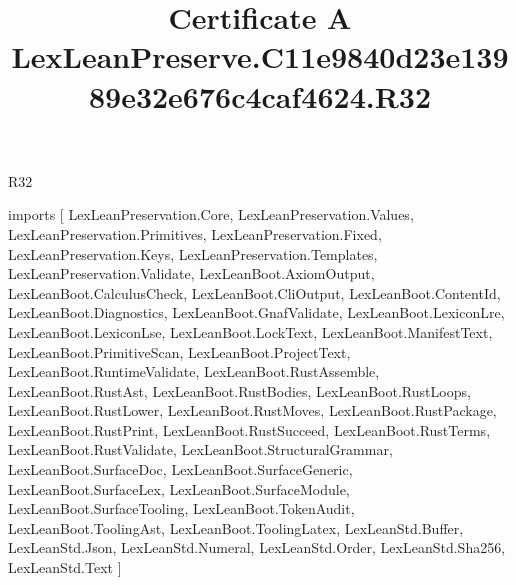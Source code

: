 \begin{lexlean}{R32}
\title{Certificate A LexLeanPreserve.C11e9840d23e13989e32e676c4caf4624.R32}
\begin{coremodule}
imports [
  LexLeanPreservation.Core,
  LexLeanPreservation.Values,
  LexLeanPreservation.Primitives,
  LexLeanPreservation.Fixed,
  LexLeanPreservation.Keys,
  LexLeanPreservation.Templates,
  LexLeanPreservation.Validate,
  LexLeanBoot.AxiomOutput,
  LexLeanBoot.CalculusCheck,
  LexLeanBoot.CliOutput,
  LexLeanBoot.ContentId,
  LexLeanBoot.Diagnostics,
  LexLeanBoot.GnafValidate,
  LexLeanBoot.LexiconLre,
  LexLeanBoot.LexiconLse,
  LexLeanBoot.LockText,
  LexLeanBoot.ManifestText,
  LexLeanBoot.PrimitiveScan,
  LexLeanBoot.ProjectText,
  LexLeanBoot.RuntimeValidate,
  LexLeanBoot.RustAssemble,
  LexLeanBoot.RustAst,
  LexLeanBoot.RustBodies,
  LexLeanBoot.RustLoops,
  LexLeanBoot.RustLower,
  LexLeanBoot.RustMoves,
  LexLeanBoot.RustPackage,
  LexLeanBoot.RustPrint,
  LexLeanBoot.RustSucceed,
  LexLeanBoot.RustTerms,
  LexLeanBoot.RustValidate,
  LexLeanBoot.StructuralGrammar,
  LexLeanBoot.SurfaceDoc,
  LexLeanBoot.SurfaceGeneric,
  LexLeanBoot.SurfaceLex,
  LexLeanBoot.SurfaceModule,
  LexLeanBoot.SurfaceTooling,
  LexLeanBoot.TokenAudit,
  LexLeanBoot.ToolingAst,
  LexLeanBoot.ToolingLatex,
  LexLeanStd.Buffer,
  LexLeanStd.Json,
  LexLeanStd.Numeral,
  LexLeanStd.Order,
  LexLeanStd.Sha256,
  LexLeanStd.Text
]


\end{coremodule}
\end{lexlean}
